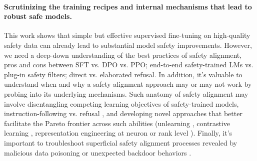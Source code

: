\paragraph{Scrutinizing the training recipes and internal mechanisms that lead to robust safe models.}
This work shows that simple but effective supervised fine-tuning on high-quality safety data can already lead to substantial model safety improvements. However, we need a deep-down understanding of the best practices of safety alignment, \eg pros and cons between SFT vs. DPO vs. PPO; end-to-end safety-trained LMs vs. plug-in safety filters; direct vs. elaborated refusal. In addition, it's valuable to understand when and why a safety alignment approach may or may not work by probing into its underlying mechanisms. Such anatomy of safety alignment may involve disentangling competing learning objectives of safety-trained models, \ie instruction-following vs. refusal \citep{wei2023jailbroken}, and developing novel approaches that better facilitate the Pareto frontier across such abilities (\eg unlearning \citep{goel2024corrective}, contrastive learning \citep{zou2024improving}, representation engineering at neuron or rank level \citep{wei2024assessing}). Finally, it's important to troubleshoot superficial safety alignment processes \citep{zhou2024lima, lubana2023mechanistic} revealed by malicious data poisoning \citep{qi2023fine} or unexpected backdoor behaviors \citep{hubinger2024sleeper}.

